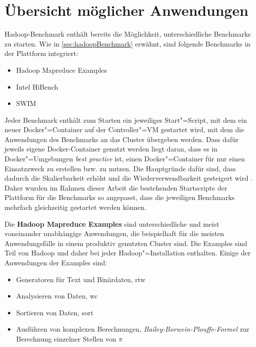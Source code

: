 \section{Übersicht möglicher Anwendungen}\label{sec:appOverview}

Hadoop-Benchmark enthält bereits die Möglichkeit, unterschiedliche Benchmarks zu starten. Wie in \autoref{sec:hadoopBenchmark} erwähnt, sind folgende Benchmarks in der Plattform integriert:

\begin{itemize}
    \item Hadoop Mapreduce Examples
    \item Intel HiBench
    \item \ac{SWIM}
\end{itemize}

Jeder Benchmark enthält zum Starten ein jeweiliges Start"=Script, mit dem ein neuer Docker"=Container auf der Controller"=VM gestartet wird, mit dem die Anwendungen des Benchmarks an das Cluster übergeben werden. Dass dafür jeweils eigene Docker-Container genutzt werden liegt daran, dass es in Docker"=Umgebungen \emph{best practice} ist, einen Docker"=Container für nur einen Einsatzzweck zu erstellen bzw. zu nutzen. Die Hauptgründe dafür sind, dass dadurch die Skalierbarkeit erhöht und die Wiederverwendbarkeit gesteigert wird \cite{DockerBestPractice}. Daher wurden im Rahmen dieser Arbeit die bestehenden Startscripte der Plattform für die Benchmarks so angepasst, dass die jeweiligen Benchmarks mehrfach gleichzeitig gestartet werden können.

Die \textbf{Hadoop Mapreduce Examples} sind unterschiedliche und meist voneinander unabhängige Anwendungen, die beispielhaft für die meisten Anwendungsfälle in einem produktiv genutzten Cluster sind. Die Examples sind Teil von Hadoop und daher bei jeder Hadoop"=Installation enthalten. Einige der Anwendungen der Examples sind:

\begin{itemize}
    \item Generatoren für Text und Binärdaten, \zB \acl{rtw}
    \item Analysieren von Daten, \zB \acl{wc}
    \item Sortieren von Daten, \zB \acl{sort}
    \item Ausführen von komplexen Berechnungen, \zB \emph{Bailey-Borwein-Plouffe-Formel} zur Berechnung einzelner Stellen von $\pi$
\end{itemize}

